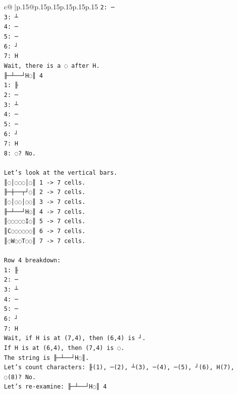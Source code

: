 \documentclass{article}
\begin{document}
{\begin{supertabular}{c@{$\;$}|p{.15\linewidth}@{}p{.15\linewidth}p{.15\linewidth}p{.15\linewidth}p{.15\linewidth}p{.15\linewidth}}
{{{\texttt{2: ─} \\
\texttt{3: ┴} \\
\texttt{4: ─} \\
\texttt{5: ─} \\
\texttt{6: ┘} \\
\texttt{7: H} \\
\texttt{Wait, there is a ◌ after H.} \\
\texttt{╟─┴──┘H◌║ 4} \\
\texttt{1: ╟} \\
\texttt{2: ─} \\
\texttt{3: ┴} \\
\texttt{4: ─} \\
\texttt{5: ─} \\
\texttt{6: ┘} \\
\texttt{7: H} \\
\texttt{8: ◌? No.} \\
\\ 
\texttt{Let's look at the vertical bars.} \\
\texttt{║◌│◌◌◌│◌║ 1 {-}> 7 cells.} \\
\texttt{╟─┼──┬┘◌║ 2 {-}> 7 cells.} \\
\texttt{║◌│◌◌│◌◌║ 3 {-}> 7 cells.} \\
\texttt{╟─┴──┘H◌║ 4 {-}> 7 cells.} \\
\texttt{║◌◌◌◌◌I◌║ 5 {-}> 7 cells.} \\
\texttt{║C◌◌◌◌◌◌║ 6 {-}> 7 cells.} \\
\texttt{║◌W◌◌T◌◌║ 7 {-}> 7 cells.} \\
\\ 
\texttt{Row 4 breakdown:} \\
\texttt{1: ╟} \\
\texttt{2: ─} \\
\texttt{3: ┴} \\
\texttt{4: ─} \\
\texttt{5: ─} \\
\texttt{6: ┘} \\
\texttt{7: H} \\
\texttt{Wait, if H is at (7,4), then (6,4) is ┘.} \\
\texttt{If H is at (6,4), then (7,4) is ◌.} \\
\texttt{The string is ╟─┴──┘H◌║.} \\
\texttt{Let's count characters: ╟(1), ─(2), ┴(3), ─(4), ─(5), ┘(6), H(7), ◌(8)? No.} \\
\texttt{Let's re{-}examine: ╟─┴──┘H◌║ 4} \\
}}}
\end{supertabular}}
\end{document}
